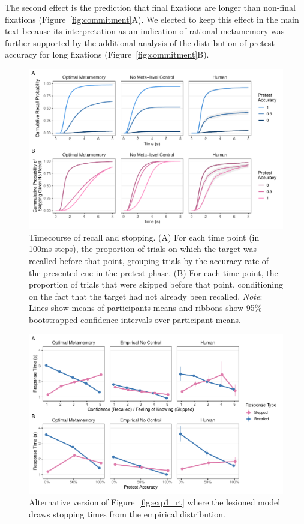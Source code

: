 The second effect is the prediction that final fixations are longer than non-final fixations (Figure~\ref{fig:commitment}A). We elected to keep this effect in the main text because its interpretation as an indication of rational metamemory was further supported by the additional analysis of the distribution of pretest accuracy for long fixations (Figure~\ref{fig:commitment}B).

\begin{figure}[]
  \includegraphics[scale=.65]{figs/memory/exp1/cum_probs.pdf}
  \caption{%
    Timecourse of recall and stopping.
    (A) For each time point (in 100ms steps), the proportion of trials on which the target was recalled before that point, grouping trials by the accuracy rate of the presented cue in the pretest phase.
    (B) For each time point, the proportion of trials that were skipped before that point, conditioning on the fact that the target had not already been recalled.
    \emph{Note}: Lines show means of participants means and ribbons show 95\% bootstrapped confidence intervals over participant means.
  }
  \label{fig:exp1_cum}
\end{figure}


\begin{figure}[]
  \includegraphics[scale=.65]{figs/memory/exp1_alt/rt.pdf}
  \caption{Alternative version of Figure~\ref{fig:exp1_rt} where the lesioned model draws stopping times from the empirical distribution.}
  \label{fig:exp1_rt_alt}
\end{figure}

